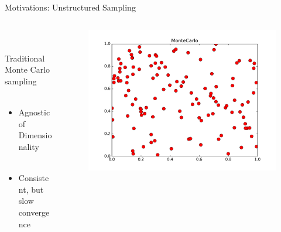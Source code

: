 \documentclass[t,9pt,svgnames]{beamer}
\begin{document}
\begin{frame}{Motivations: Unstructured Sampling}
  \vfill
  \begin{columns}
    \begin{column}{0.5\textwidth}
      ~\\~\\
      Traditional Monte Carlo sampling
      ~\\~\\
      \begin{itemize}
        \item Agnostic of Dimensionality
      ~\\~\\
        \item Consistent, but slow convergence
      \end{itemize}
      ~\\~\\
    \end{column}
    \begin{column}{0.5\textwidth}
      \begin{figure}
        \includegraphics[width=\linewidth]{pics/mc.pdf}
      \end{figure}
    \end{column}
  \end{columns}
  \vfill
\end{frame}
\end{document}
